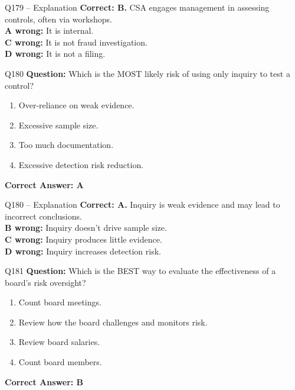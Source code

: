 \documentclass[aspectratio=169,10pt]{beamer}
\begin{document}
	\begin{frame}[t]{Q179 -- Explanation}
		\small
		\textbf{Correct: B.} CSA engages management in assessing controls, often via workshops. \\[4pt]
		\textbf{A wrong:} It is internal. \\[2pt]
		\textbf{C wrong:} It is not fraud investigation. \\[2pt]
		\textbf{D wrong:} It is not a filing.
	\end{frame}
	
	\begin{frame}[t]{Q180}
		\small
		\textbf{Question:} Which is the MOST likely risk of using only inquiry to test a control?
		\begin{enumerate}[label=\Alph*.,itemsep=1pt,topsep=2pt]
			\item Over-reliance on weak evidence.
			\item Excessive sample size.
			\item Too much documentation.
			\item Excessive detection risk reduction.
		\end{enumerate}
		\vspace{4pt}
		\textbf{Correct Answer: A}
	\end{frame}
	
	\begin{frame}[t]{Q180 -- Explanation}
		\small
		\textbf{Correct: A.} Inquiry is weak evidence and may lead to incorrect conclusions. \\[4pt]
		\textbf{B wrong:} Inquiry doesn't drive sample size. \\[2pt]
		\textbf{C wrong:} Inquiry produces little evidence. \\[2pt]
		\textbf{D wrong:} Inquiry increases detection risk.
	\end{frame}
	
	\begin{frame}[t]{Q181}
		\small
		\textbf{Question:} Which is the BEST way to evaluate the effectiveness of a board's risk oversight?
		\begin{enumerate}[label=\Alph*.,itemsep=1pt,topsep=2pt]
			\item Count board meetings.
			\item Review how the board challenges and monitors risk.
			\item Review board salaries.
			\item Count board members.
		\end{enumerate}
		\vspace{4pt}
		\textbf{Correct Answer: B}
	\end{frame}
	
\end{document}
